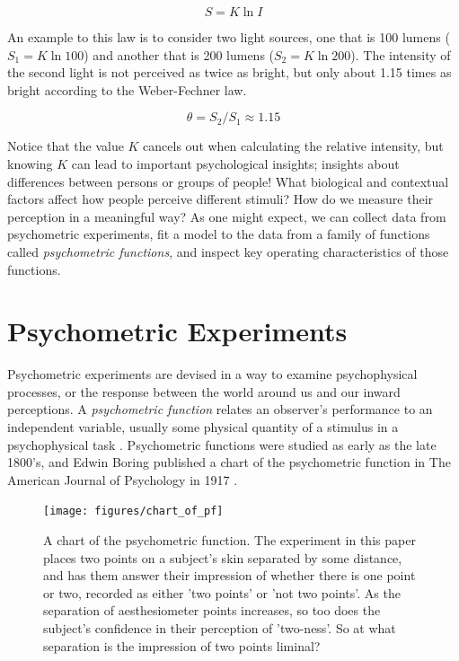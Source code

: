\documentclass[11pt, oneside, openany]{scrbook}
\begin{document}
\[S = K \ln I\]

An example to this law is to consider two light sources, one that is 100 lumens (\(S_1 = K \ln 100\)) and another that is 200 lumens (\(S_2 = K \ln 200\)). The intensity of the second light is not perceived as twice as bright, but only about 1.15 times as bright according to the Weber-Fechner law.

\[\theta = S_2 / S_1 \approx 1.15\]

Notice that the value \(K\) cancels out when calculating the relative intensity, but knowing \(K\) can lead to important psychological insights; insights about differences between persons or groups of people! What biological and contextual factors affect how people perceive different stimuli? How do we measure their perception in a meaningful way? As one might expect, we can collect data from psychometric experiments, fit a model to the data from a family of functions called \emph{psychometric functions}, and inspect key operating characteristics of those functions.

\hypertarget{psycho-experiments}{%
\section{Psychometric Experiments}\label{psycho-experiments}}

Psychometric experiments are devised in a way to examine psychophysical processes, or the response between the world around us and our inward perceptions. A \emph{psychometric function} relates an observer's performance to an independent variable, usually some physical quantity of a stimulus in a psychophysical task \citep{wichmann2001a}. Psychometric functions were studied as early as the late 1800's, and Edwin Boring published a chart of the psychometric function in The American Journal of Psychology in 1917 \citep{boring1917chart}.

\begin{figure}

{\centering \texttt{[image: figures/chart\_of\_pf]} 

}

\caption{A chart of the psychometric function. The experiment in this paper places two points on a subject's skin separated by some distance, and has them answer their impression of whether there is one point or two, recorded as either 'two points' or 'not two points'. As the separation of aesthesiometer points increases, so too does the subject's confidence in their perception of 'two-ness'. So at what separation is the impression of two points liminal?}\label{fig:ch020-chart-of-pf}
\end{figure}
\end{document}
